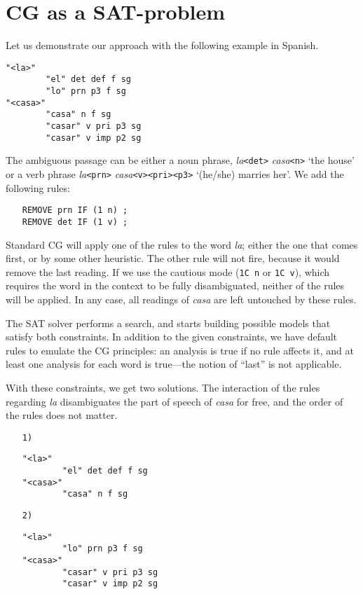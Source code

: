 \section{CG as a SAT-problem}
Let us demonstrate our approach with the following example in Spanish.

\begin{verbatim}
"<la>"
        "el" det def f sg
        "lo" prn p3 f sg
"<casa>"
        "casa" n f sg
        "casar" v pri p3 sg
        "casar" v imp p2 sg
\end{verbatim}

The ambiguous passage can be either a noun phrase, \emph{la}\texttt{<det>} \emph{casa}\texttt{<n>} 
`the house'  or a verb phrase \emph{la}\texttt{<prn>}  \emph{casa}\texttt{<v><pri><p3>} `(he/she) marries her'. 
We add the following rules:

\begin{itemize}
\item [] \texttt{REMOVE prn IF (1 n) ;} \\
             \texttt{REMOVE det IF (1 v) ;}
\end{itemize}

Standard CG will apply one  of the rules to the word \emph{la}; 
either the one that comes first, or by some other heuristic. 
The other rule will not fire, because it would remove the last
reading. 
If we use the cautious mode (\texttt{1C n} or \texttt{1C v}), which
 requires the word in the context to be fully disambiguated, 
neither of the rules will be applied.
In any case, all readings of \emph{casa} are left untouched by these rules.

The SAT solver performs a search, 
and starts building possible models that satisfy both constraints. 
In addition to the given constraints, we have default rules to emulate
the CG principles: an analysis is true if no rule affects it,
and at least one analysis for each word is true---the notion of
``last'' is not applicable.

With these constraints, we get two solutions. The interaction of the
rules regarding \emph{la}  disambiguates the part of speech of
\emph{casa} for free, and the order of the rules does not matter. 

\begin{enumerate}
\item [\texttt{1)}]
\begin{verbatim}
"<la>"
        "el" det def f sg
"<casa>"
        "casa" n f sg
\end{verbatim}
\item [\texttt{2)}]
\begin{verbatim}
"<la>"
        "lo" prn p3 f sg
"<casa>"
        "casar" v pri p3 sg
        "casar" v imp p2 sg
\end{verbatim}
\end{enumerate} 

